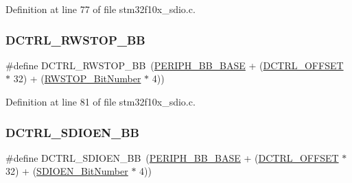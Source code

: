 Definition at line 77 of file stm32f10x\+\_\+sdio.\+c.

\mbox{\label{group___s_d_i_o___private___types_definitions_ga678da1db835676b0fb1976cf3408e2d1}} 
\subsubsection{\texorpdfstring{D\+C\+T\+R\+L\+\_\+\+R\+W\+S\+T\+O\+P\+\_\+\+BB}{DCTRL\_RWSTOP\_BB}}
{\footnotesize\ttfamily \#define D\+C\+T\+R\+L\+\_\+\+R\+W\+S\+T\+O\+P\+\_\+\+BB~(\hyperlink{group___peripheral__memory__map_gaed7efc100877000845c236ccdc9e144a}{P\+E\+R\+I\+P\+H\+\_\+\+B\+B\+\_\+\+B\+A\+SE} + (\hyperlink{group___s_d_i_o___private___types_definitions_ga948c1382c4cfd3af3e406c4d0cdd4240}{D\+C\+T\+R\+L\+\_\+\+O\+F\+F\+S\+ET} $\ast$ 32) + (\hyperlink{group___s_d_i_o___private___types_definitions_gae8c0654ad5cba23281bcfa77ef19b9cf}{R\+W\+S\+T\+O\+P\+\_\+\+Bit\+Number} $\ast$ 4))}



Definition at line 81 of file stm32f10x\+\_\+sdio.\+c.

\mbox{\label{group___s_d_i_o___private___types_definitions_ga894f7da62b89ddd9f4b79d066056a3c7}} 
\subsubsection{\texorpdfstring{D\+C\+T\+R\+L\+\_\+\+S\+D\+I\+O\+E\+N\+\_\+\+BB}{DCTRL\_SDIOEN\_BB}}
{\footnotesize\ttfamily \#define D\+C\+T\+R\+L\+\_\+\+S\+D\+I\+O\+E\+N\+\_\+\+BB~(\hyperlink{group___peripheral__memory__map_gaed7efc100877000845c236ccdc9e144a}{P\+E\+R\+I\+P\+H\+\_\+\+B\+B\+\_\+\+B\+A\+SE} + (\hyperlink{group___s_d_i_o___private___types_definitions_ga948c1382c4cfd3af3e406c4d0cdd4240}{D\+C\+T\+R\+L\+\_\+\+O\+F\+F\+S\+ET} $\ast$ 32) + (\hyperlink{group___s_d_i_o___private___types_definitions_ga37f3e1612e0dae8160be978ebfa54301}{S\+D\+I\+O\+E\+N\+\_\+\+Bit\+Number} $\ast$ 4))}



